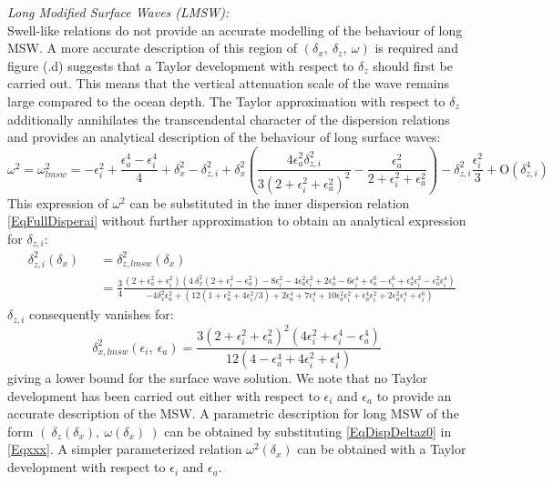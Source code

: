 \documentclass[a4paper,11pt]{article}
\begin{document}
\textit{Long Modified Surface Waves (LMSW):}\\
Swell-like relations do not provide an accurate modelling of the behaviour of long MSW. A more accurate description of this region of $(\delta_x,\ \delta_z,\ \omega)$ is required and figure (.d) suggests that a Taylor development with respect to $\delta_z$ should first be carried out. This means that the vertical attenuation scale of the wave remains large compared to the ocean depth. The Taylor approximation with respect to $\delta_z$ additionally annihilates the transcendental character of the dispersion relations and provides an analytical description of the behaviour of long surface waves:
\begin{equation}
	\label{Eqxxx}
     \omega^2=\omega^2_{lmsw}= 
     -\epsilon_i^2+\frac{\epsilon_a^4-\epsilon_i^4}{4}
     +\delta_x^2-\delta_{z,i}^2
     +\delta_x^2\left( 
 		\frac{4\epsilon_a^2\delta_{z,i}^2}{3(2+\epsilon_i^2+\epsilon_a^2)^2}
 		-\frac{\epsilon_a^2}{2+\epsilon_i^2+\epsilon_a^2}
 	\right)
 	-\delta_{z,i}^2\frac{\epsilon_i^2}{3}
 	+ \mathrm{O}(\delta_{z,i}^4)
\end{equation}
This expression of $\omega^2$ can be substituted in the inner dispersion relation \ref{EqFullDisperai} without further approximation to obtain an analytical expression for $\delta_{z,i}$:
\begin{subequations}
	\begin{alignat}{2}
 		& \delta_{z,i}^2(\delta_x) &&=\delta_{z,lmsw}^2(\delta_x)\\[3mm]
		\label{EqDispDeltaz0}
 		& &&=\frac{3}{4}
 		\frac{
 		(2+\epsilon_a^2+\epsilon_i^2)
 		\left(
 		4\ \delta_x^2(2+\epsilon_i^2-\epsilon_a^2)
 		-8\epsilon_i^2-4\epsilon_a^2\epsilon_i^2
 		+2\epsilon_a^4-6\epsilon_i^4
 		+\epsilon_a^6-\epsilon_i^6
 		+\epsilon_a^4\epsilon_i^2
 		-\epsilon_a^2\epsilon_i^4
 		\right)
 		}
 		{-4\delta_x^2\epsilon_a^2
 		+\left(12(1+\epsilon_a^2+4\epsilon_i^2/3)
 		+2\epsilon_a^4+7\epsilon_i^4
 		+10\epsilon_a^2\epsilon_i^2
 		+\epsilon_a^4\epsilon_i^2
 		+2\epsilon_a^2\epsilon_i^4
 		+\epsilon_i^6 \right)
 		}
 	\end{alignat}
\end{subequations}
$\delta_{z,i}$ consequently vanishes for:
\begin{equation}
	\label{EqDispDeltazLim0}
	\delta_{x,lmsw}^2(\epsilon_i,\ \epsilon_a)=\frac{
	3(2+\epsilon_i^2+\epsilon_a^2)^2
	(4\epsilon_i^2+\epsilon_i^4-\epsilon_a^4)
	}
	{
	12(4-\epsilon_a^4+4\epsilon_i^2+\epsilon_i^4)
	}
\end{equation}
giving a lower bound for the surface wave solution. We note that no Taylor development has been carried out either with respect to $\epsilon_i$ and $\epsilon_a$ to provide an accurate description of the MSW. A parametric description for long MSW of the form $(\ \delta_z(\delta_x),\ \omega(\delta_x)\ )$ can be obtained by substituting \ref{EqDispDeltaz0} in \ref{Eqxxx}. A simpler parameterized relation $\omega^2(\delta_x)$ can be obtained with a Taylor development with respect to $\epsilon_i$ and $\epsilon_a$.\\
\end{document}
